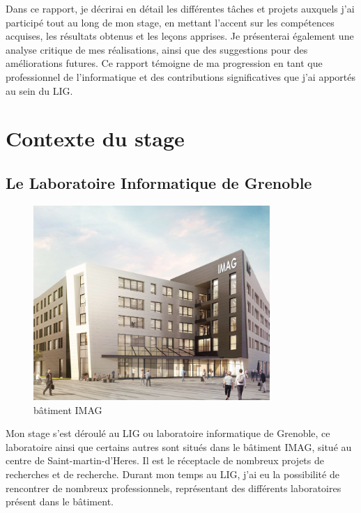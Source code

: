 \documentclass[a4paper,french,12pt, titlepage]{article}
\begin{document}
Dans ce rapport, je décrirai en détail les différentes tâches et projets
auxquels j'ai participé tout au long de mon stage, en mettant l'accent
sur les compétences acquises, les résultats obtenus et les leçons
apprises. Je présenterai également une analyse critique de mes
réalisations, ainsi que des suggestions pour des améliorations futures.
Ce rapport témoigne de ma progression en tant que professionnel de
l'informatique et des contributions significatives que j'ai apportés au
sein du LIG.

\newpage

\hypertarget{contexte-du-stage}{%
\section{Contexte du stage}\label{contexte-du-stage}}

\hypertarget{le-laboratoire-informatique-de-grenoble}{%
\subsection{Le Laboratoire Informatique de
Grenoble}\label{le-laboratoire-informatique-de-grenoble}}

\begin{figure}[h]
\centering
\includegraphics[width=0.8\textwidth,height=0.8\textheight,keepaspectratio]{images/imag.png}
\caption{bâtiment IMAG}
\end{figure}

Mon stage s'est déroulé au LIG ou laboratoire informatique de Grenoble,
ce laboratoire ainsi que certains autres sont situés dans le bâtiment
IMAG, situé au centre de Saint-martin-d'Heres. Il est le réceptacle de
nombreux projets de recherches et de recherche. Durant mon temps au LIG,
j'ai eu la possibilité de rencontrer de nombreux professionnels,
représentant des différents laboratoires présent dans le
bâtiment.\newline
\end{document}
